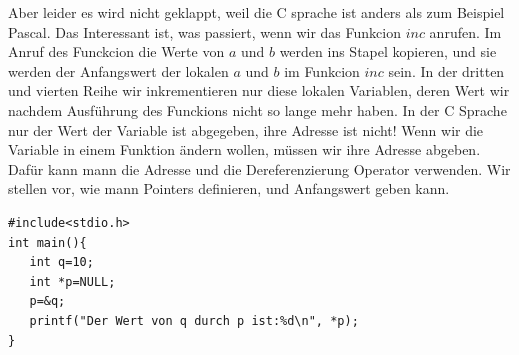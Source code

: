 \documentclass{article}[12pt]
\begin{document}
Aber leider es wird nicht geklappt, weil die C sprache ist anders als zum Beispiel Pascal. 
Das Interessant ist, was passiert, wenn wir das Funkcion $inc$ anrufen. Im Anruf des Funckcion
die Werte von $a$ und $b$ werden ins Stapel kopieren, und sie werden der Anfangswert der lokalen
$a$ und $b$ im Funkcion $inc$ sein. In der dritten und vierten Reihe wir inkrementieren nur diese 
lokalen Variablen, deren Wert wir nachdem Ausführung des Funckions nicht so lange mehr haben.
In der C Sprache nur der Wert der Variable ist abgegeben, ihre Adresse ist nicht! Wenn
wir die Variable in einem Funktion ändern wollen, müssen wir ihre Adresse abgeben. Dafür 
kann mann die Adresse und die Dereferenzierung Operator verwenden. Wir stellen vor, wie
mann Pointers definieren, und Anfangswert geben kann.
\begin{lstlisting}
#include<stdio.h>
int main(){
   int q=10;
   int *p=NULL;
   p=&q;
   printf("Der Wert von q durch p ist:%d\n", *p);
}
\end{lstlisting}
\end{document}
